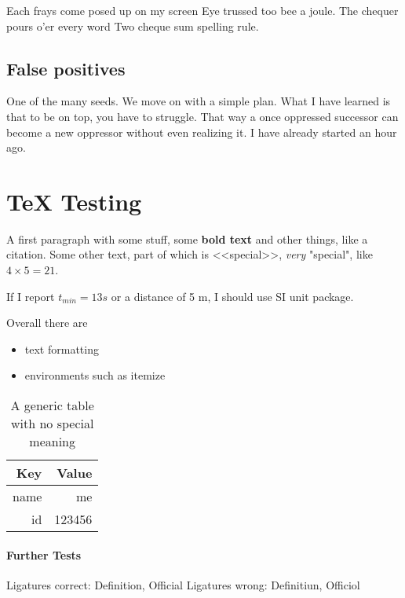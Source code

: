 \documentclass{scrartcl}
\begin{document}
Each frays come posed up on my screen
Eye trussed too bee a joule.
The chequer pours o'er every word
Two cheque sum spelling rule.



\subsection{False positives}
One of the many seeds. We move on with a simple plan.
What I have learned is that to be on top, you have to struggle.
That way a once oppressed successor can become a new oppressor without even realizing it.
I have already started an hour ago.




\section{TeX Testing}\label{sec:texsection}
A first paragraph with some stuff, some \textbf{bold text}   and other things, like a citation\cite{my:paper}.
Some other text, part of which is <<special>>, \emph{very} "special", like $4 \times 5 = 21$.

If I report $t_{min} = 13s$ or a distance of 5 m, I should use SI unit package.


Overall there are 
\begin{itemize}
	\item text formatting
	\item environments such as itemize
\end{itemize}


\begin{table}
	\centering
    \begin{tabular}{@{}rr@{}} 
    \textbf{Key}  & \textbf{Value} \\ \hline
    name & me \\
    id & 123456\\
    \end{tabular}
    \caption{A generic table with no special meaning}
    \label{tab:example}
\end{table}




\paragraph{Further Tests}
Ligatures correct: Deﬁnition, Oﬀicial
Ligatures wrong: Deﬁnitiun, Oﬀiciol
\end{document}

